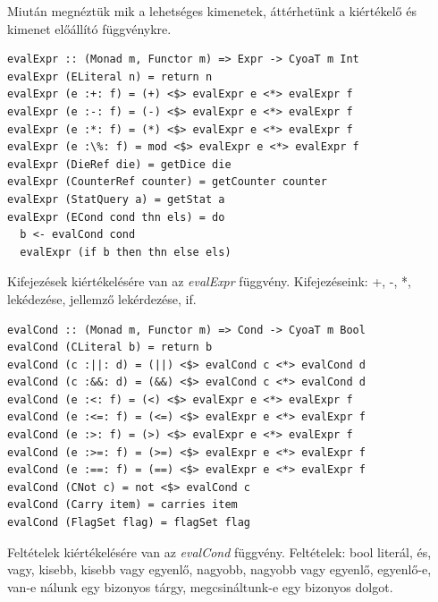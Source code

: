 \documentclass[12pt,a4paper,oneside]{report}
\begin{document}
      Miután megnéztük mik a lehetséges kimenetek, áttérhetünk a
      kiértékelő és kimenet előállító függvénykre.
      \begin{verbatim}
evalExpr :: (Monad m, Functor m) => Expr -> CyoaT m Int
evalExpr (ELiteral n) = return n
evalExpr (e :+: f) = (+) <$> evalExpr e <*> evalExpr f
evalExpr (e :-: f) = (-) <$> evalExpr e <*> evalExpr f
evalExpr (e :*: f) = (*) <$> evalExpr e <*> evalExpr f
evalExpr (e :\%: f) = mod <$> evalExpr e <*> evalExpr f
evalExpr (DieRef die) = getDice die
evalExpr (CounterRef counter) = getCounter counter
evalExpr (StatQuery a) = getStat a
evalExpr (ECond cond thn els) = do
  b <- evalCond cond
  evalExpr (if b then thn else els)
      \end{verbatim}
      Kifejezések kiértékelésére van az \emph{evalExpr}
      függvény. Kifejezéseink: +, -, *, %
      lekédezése, jellemző lekérdezése, if.

  \begin{verbatim}
evalCond :: (Monad m, Functor m) => Cond -> CyoaT m Bool
evalCond (CLiteral b) = return b
evalCond (c :||: d) = (||) <$> evalCond c <*> evalCond d
evalCond (c :&&: d) = (&&) <$> evalCond c <*> evalCond d
evalCond (e :<: f) = (<) <$> evalExpr e <*> evalExpr f
evalCond (e :<=: f) = (<=) <$> evalExpr e <*> evalExpr f
evalCond (e :>: f) = (>) <$> evalExpr e <*> evalExpr f
evalCond (e :>=: f) = (>=) <$> evalExpr e <*> evalExpr f
evalCond (e :==: f) = (==) <$> evalExpr e <*> evalExpr f
evalCond (CNot c) = not <$> evalCond c
evalCond (Carry item) = carries item
evalCond (FlagSet flag) = flagSet flag
  \end{verbatim}
  Feltételek kiértékelésére van az \emph{evalCond} függvény. Feltételek: bool
  literál, és, vagy, kisebb, kisebb vagy egyenlő, nagyobb, nagyobb
  vagy egyenlő, egyenlő-e, van-e nálunk egy bizonyos tárgy,
  megcsináltunk-e egy bizonyos dolgot.
\end{document}
